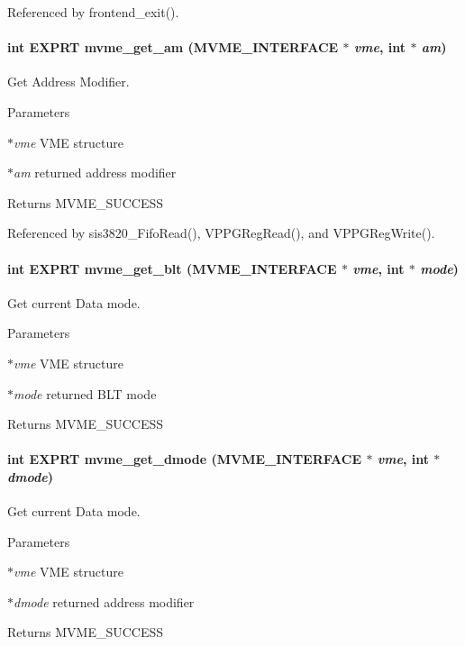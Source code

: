 Referenced by frontend\_\-exit().
\paragraph[{mvme\_\-get\_\-am}]{\setlength{\rightskip}{0pt plus 5cm}int EXPRT mvme\_\-get\_\-am ({\bf MVME\_\-INTERFACE} $\ast$ {\em vme}, \/  int $\ast$ {\em am})}\hfill\label{group__mvmestdfunctionh_gabc793acd31b43db639f2bfbf6dd21a3a}
Get Address Modifier. 
\begin{DoxyParams}{Parameters}
\item[{\em $\ast$vme}]VME structure \item[{\em $\ast$am}]returned address modifier \end{DoxyParams}
\begin{DoxyReturn}{Returns}
MVME\_\-SUCCESS 
\end{DoxyReturn}


Referenced by sis3820\_\-FifoRead(), VPPGRegRead(), and VPPGRegWrite().
\paragraph[{mvme\_\-get\_\-blt}]{\setlength{\rightskip}{0pt plus 5cm}int EXPRT mvme\_\-get\_\-blt ({\bf MVME\_\-INTERFACE} $\ast$ {\em vme}, \/  int $\ast$ {\em mode})}\hfill\label{group__mvmestdfunctionh_gaa3a42d774a391d5256c2280c9f81e720}
Get current Data mode. 
\begin{DoxyParams}{Parameters}
\item[{\em $\ast$vme}]VME structure \item[{\em $\ast$mode}]returned BLT mode \end{DoxyParams}
\begin{DoxyReturn}{Returns}
MVME\_\-SUCCESS 
\end{DoxyReturn}
\paragraph[{mvme\_\-get\_\-dmode}]{\setlength{\rightskip}{0pt plus 5cm}int EXPRT mvme\_\-get\_\-dmode ({\bf MVME\_\-INTERFACE} $\ast$ {\em vme}, \/  int $\ast$ {\em dmode})}\hfill\label{group__mvmestdfunctionh_ga0636883b22a2139b5882a933cf8bccd9}
Get current Data mode. 
\begin{DoxyParams}{Parameters}
\item[{\em $\ast$vme}]VME structure \item[{\em $\ast$dmode}]returned address modifier \end{DoxyParams}
\begin{DoxyReturn}{Returns}
MVME\_\-SUCCESS 
\end{DoxyReturn}


